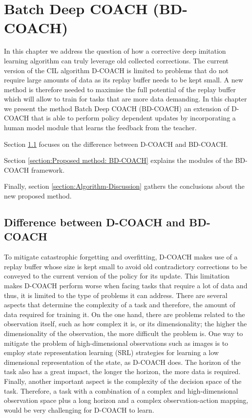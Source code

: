 \chapter{Batch Deep COACH (BD-COACH)}
\label{chapter:Proposed Method}

In this chapter we address the question of how a corrective deep imitation learning algorithm can truly leverage old collected corrections. The current version of the CIL algorithm D-COACH is limited to problems that do not require large amounts of data as its replay buffer needs to be kept small. A new method is therefore needed to maximise the full potential of the replay buffer which will allow to train for tasks that are more data demanding. In this chapter we present the method Batch Deep COACH (BD-COACH) an extension of D-COACH that is able to perform policy dependent updates by incorporating a  human model module that learns the feedback from the teacher.

Section \ref{section:Difference between D-COACH and BD-COACH} focuses on the difference between D-COACH and BD-COACH.

Section \ref{section:Proposed method: BD-COACH} explains the modules of the BD-COACH framework.


Finally, section \ref{section:Algorithm-Discussion} gathers the conclusions about the new proposed method.  


\section{Difference between D-COACH and BD-COACH}
\label{section:Difference between D-COACH and BD-COACH}

To mitigate catastrophic forgetting and overfitting, D-COACH makes use of a replay buffer whose size is kept small to avoid old contradictory corrections to be conveyed to the current version of the policy for its update. This limitation makes D-COACH perform worse when facing tasks that require a lot of data and thus, it is limited to the type of problems it can address. There are several aspects that determine the complexity of a task and therefore, the amount of data required for training it. On the one hand, there are problems related to the observation itself, such as how complex it is, or its dimensionality; the higher the dimensionality of the observation, the more difficult the problem is. One way to mitigate the problem of high-dimensional observations such as images is to employ state representation learning (SRL) strategies for learning a low dimensional representation of the state, as D-COACH does. The horizon of the task also has a great impact, the longer the horizon, the more data is required. Finally, another important aspect is the complexity of the decision space of the task. Therefore, a task with a combination of a complex and high-dimensional observation space plus a long horizon and a complex observation-action mapping, would be very challenging for D-COACH to learn.






